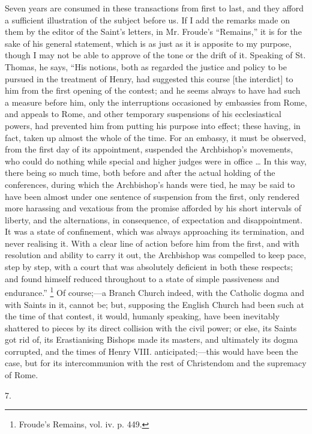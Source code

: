 Seven years are consumed in these transactions from first to last,
and they afford a sufficient illustration of the subject before us. If
I add the remarks made on them by the editor of the Saint's letters,
in Mr. Froude's ``Remains,'' it is for the sake of his general
statement, which is as just as it is apposite to my purpose, though I
may not be able to approve of the tone or the drift of it. Speaking of
St. Thomas, he says, ``His notions, both as regarded the justice
and policy to be pursued in the treatment of Henry, had suggested this
course [the interdict] to him from the first opening of the contest;
and he seems always to have had such a measure before him, only the
interruptions occasioned by embassies from Rome, and appeals to Rome,
and other temporary suspensions of his ecclesiastical powers, had
prevented him from putting his purpose into effect; these having, in
fact, taken up almost the whole of the time. For an embassy, it must
be observed, from the first day of its appointment, suspended the
Archbishop's movements, who could do nothing while special and higher
judges were in office … In this way, there being so much time, both
before and after the actual holding of the conferences, during which
the Archbishop's hands were tied, he may be said to have been almost
under one sentence of suspension from the first, only rendered more
harassing and vexatious from the promise afforded by his short
intervals of liberty, and the alternations, in consequence, of
expectation and disappointment. It was a state of confinement, which
was always approaching its termination, and never realising it. With a
clear line of action before him from the first, and with resolution
and ability to carry it out, the Archbishop was compelled to keep
pace, step by step, with a court that was absolutely deficient in both
these respects; and found himself reduced throughout to a state of
simple passiveness and endurance.'' \footnote{Froude's Remains, vol. iv. p. 449.} Of course;—a Branch Church indeed, with the Catholic dogma
and with Saints in it, cannot be; but, supposing the English Church
had been such at the time of that contest, it would, humanly speaking,
have been inevitably shattered to pieces by its direct collision with
the civil power; or else, its Saints got rid of, its Erastianising
Bishops made its masters, and ultimately its dogma corrupted, and the
times of Henry VIII. anticipated;—this would have been the case, but
for its intercommunion with the rest of Christendom and the supremacy
of Rome.

7.

